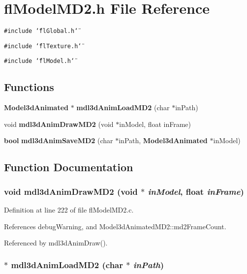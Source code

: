 \section{fl\-Model\-MD2.h File Reference}
\label{flModelMD2_8h}
{\tt \#include \char`\"{}fl\-Global.h\char`\"{}}\par
{\tt \#include \char`\"{}fl\-Texture.h\char`\"{}}\par
{\tt \#include \char`\"{}fl\-Model.h\char`\"{}}\par
\subsection*{Functions}
\begin{CompactItemize}
\item 
{\bf Model3d\-Animated} $\ast$ {\bf mdl3d\-Anim\-Load\-MD2} (char $\ast$in\-Path)
\item 
void {\bf mdl3d\-Anim\-Draw\-MD2} (void $\ast$in\-Model, float in\-Frame)
\item 
{\bf bool} {\bf mdl3d\-Anim\-Save\-MD2} (char $\ast$in\-Path, {\bf Model3d\-Animated} $\ast$in\-Model)
\end{CompactItemize}


\subsection{Function Documentation}
\subsubsection{\setlength{\rightskip}{0pt plus 5cm}void mdl3d\-Anim\-Draw\-MD2 (void $\ast$ {\em in\-Model}, float {\em in\-Frame})}\label{flModelMD2_8h_fe14c5983ff7ec31b62b50fc5c83eaf9}




Definition at line 222 of file fl\-Model\-MD2.c.

References debug\-Warning, and Model3d\-Animated\-MD2::md2Frame\-Count.

Referenced by mdl3d\-Anim\-Draw().
\subsubsection{$\ast$ mdl3d\-Anim\-Load\-MD2 (char $\ast$ {\em in\-Path})}\label{flModelMD2_8h_44cbc511d53f5bac06b5abea496f5c29}




